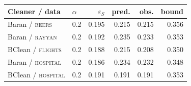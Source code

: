 \small
\setlength{\tabcolsep}{3.5pt}
\renewcommand{\arraystretch}{0.9}
\begin{tabular}{@{}llrrrr@{}}
\toprule
Cleaner / data & $\alpha$ & $\varepsilon_S$ & pred. & obs. & bound \\
\midrule
Baran / \textsc{beers} & 0.2 & 0.195 & 0.215 & 0.215 & 0.356 \\
Baran / \textsc{rayyan} & 0.2 & 0.192 & 0.235 & 0.233 & 0.353 \\
BClean / \textsc{flights} & 0.2 & 0.188 & 0.215 & 0.208 & 0.350 \\
Baran / \textsc{hospital} & 0.2 & 0.186 & 0.234 & 0.232 & 0.348 \\
BClean / \textsc{hospital} & 0.2 & 0.191 & 0.191 & 0.191 & 0.353 \\
\bottomrule
\end{tabular}
